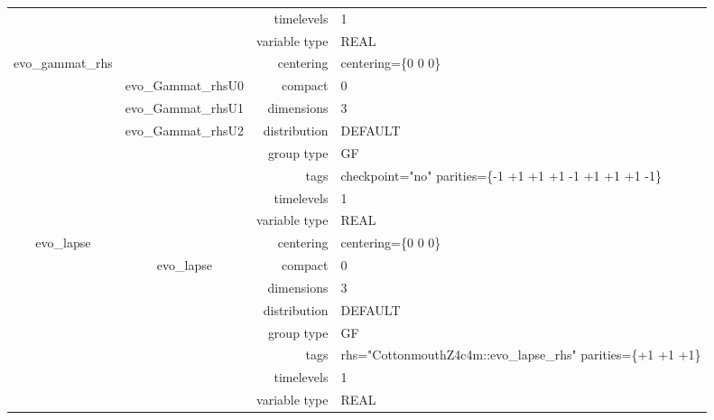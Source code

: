 \begin{tabular*}{150mm}{|c|c@{\extracolsep{\fill}}|rl|}
 &  & timelevels & 1 \\ 
 &  & variable type & REAL \\ 
\hline 
evo\_gammat\_rhs &  & centering & centering=\{0 0 0\} \\ 
 & evo\_Gammat\_rhsU0 & compact & 0 \\ 
 & evo\_Gammat\_rhsU1 & dimensions & 3 \\ 
 & evo\_Gammat\_rhsU2 & distribution & DEFAULT \\ 
 &  & group type & GF \\ 
 &  & tags & checkpoint="no" parities=\{-1 +1 +1  +1 -1 +1  +1 +1 -1\} \\ 
 &  & timelevels & 1 \\ 
 &  & variable type & REAL \\ 
\hline 
evo\_lapse &  & centering & centering=\{0 0 0\} \\ 
 & evo\_lapse & compact & 0 \\ 
 &  & dimensions & 3 \\ 
 &  & distribution & DEFAULT \\ 
 &  & group type & GF \\ 
 &  & tags & rhs="CottonmouthZ4c4m::evo\_lapse\_rhs" parities=\{+1 +1 +1\} \\ 
 &  & timelevels & 1 \\ 
 &  & variable type & REAL \\ 
\hline 
\end{tabular*} 



\vspace{5mm}
\vspace{5mm}

